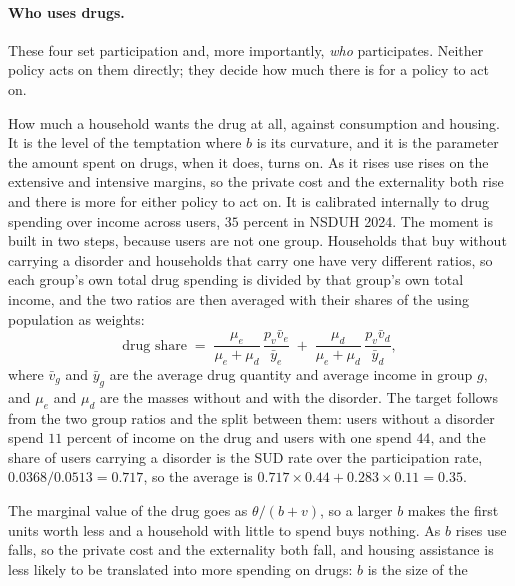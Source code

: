 \documentclass[10pt]{article}
\begin{document}


\paragraph{Who uses drugs.} These four set participation and, more importantly,
\emph{who} participates. Neither policy acts on them directly; they decide how much
there is for a policy to act on.
\begin{description}\setlength{\itemsep}{0.25em}\setlength{\parskip}{0em}
\item[$\theta$, the weight on the drug in utility.]
How much a household wants the drug at all, against consumption and
housing. It is the level of the temptation where $b$ is its curvature, and it is
the parameter the amount spent on drugs, when it does, turns on. As it
rises use rises on the extensive and intensive margins, so the private
cost and the externality both rise and there is more for
either policy to act on. It is calibrated internally to drug spending
over income across users, $35$ percent in NSDUH 2024. The moment is
built in two steps, because users are not one group. Households that buy without
carrying a disorder and households that carry one have very different ratios, so
each group's own total drug spending is divided by that group's own total income,
and the two ratios are then averaged with their shares of the using population as
weights:
\begin{equation*}
\text{drug share}\;=\;
\frac{\mu_e}{\mu_e+\mu_d}\,\frac{p_v \bar v_e}{\bar y_e}
\;+\;
\frac{\mu_d}{\mu_e+\mu_d}\,\frac{p_v \bar v_d}{\bar y_d},
\end{equation*}
where $\bar v_g$ and $\bar y_g$ are the average drug quantity and
average income in group $g$, and $\mu_e$ and $\mu_d$ are the masses without and
with the disorder. The target follows from the two group ratios and the split
between them: users without a disorder spend $11$ percent of income on the drug
and users with one spend $44$, and the share of users carrying a
disorder is the SUD rate over the participation rate, $0.0368/0.0513=0.717$, so
the average is $0.717\times0.44+0.283\times0.11=0.35$.
\item[$b$, whether a household uses at all.] The marginal value of the drug goes
as $\theta/(b+v)$, so a larger $b$ makes the first units worth less and a household
with little to spend buys nothing. As $b$ rises use falls, so the
private cost and the externality both fall, and housing assistance is
less likely to be translated into more spending on drugs: $b$ is the size of the

\end{description}
\end{document}
